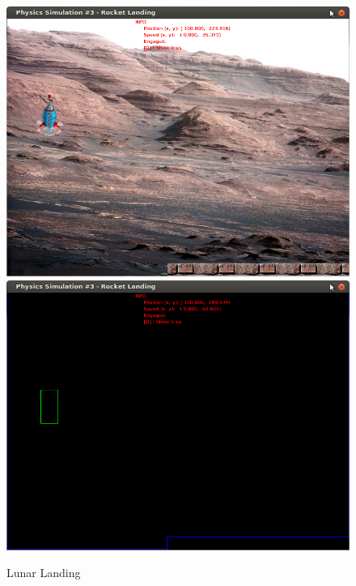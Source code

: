   \begin{figure}
	\centering
	\caption{Lunar Landing}
    \includegraphics[scale=0.4]{images/lunarLanding.png}
    \includegraphics[scale=0.4]{images/lunarLandingE.png}
  \end{figure}

